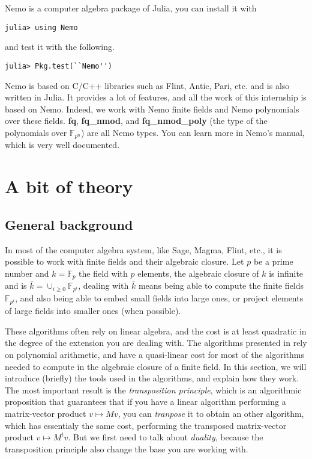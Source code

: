 \documentclass[a4paper,11pt]{article}
\theoremstyle{break}
\theoremstyle{definition}
\theoremstyle{remark}
\begin{document}
Nemo is a computer algebra package of Julia, you can install it with 
\begin{verbatim}
julia> using Nemo
\end{verbatim}
and test it with the following.
\begin{verbatim}
julia> Pkg.test(``Nemo'')
\end{verbatim}
Nemo is based on C/C++ libraries such as Flint, Antic, Pari, etc. and is also
written in Julia. It provides a lot of features, and all the work of this
internship is based on Nemo. Indeed, we work with Nemo finite fields and Nemo
polynomials over these fields. \textbf{fq}, \textbf{fq\_nmod}, and
\textbf{fq\_nmod\_poly} (the type of the polynomials over $\mathbb{F}_{p^n}$) 
are
all Nemo types. You can learn more in Nemo's manual, which is very well
documented.

\section{A bit of theory}
\subsection{General background}
In most of the computer algebra system, like Sage, Magma, Flint, etc., it is 
possible to work with finite
fields and their algebraic closure. Let $p$ be a prime number and
$k=\mathbb{F}_p$ the field with $p$ elements, the algebraic closure of $k$ is
infinite and is $\bar k = \cup_{i\geq 0} \mathbb{F}_{p^i}$, dealing with $\bar
k$ means being able to compute the finite fields $\mathbb{F}_{p^i}$, and also
being able to embed small fields into large ones, or project elements of large
fields into smaller ones (when possible).

These algorithms often rely on linear algebra, and the cost is at least 
quadratic in
the degree of the extension you are dealing with. The algorithms presented in
\cite{DeDoSc14} rely on polynomial arithmetic, and have a quasi-linear cost for 
most of the algorithms needed to
compute in the algebraic closure of a finite field. In this section, we will
introduce (briefly) the tools used in the algorithms, and explain how they work.
The most important result is the \emph{transposition principle}, which is an
algorithmic proposition that guarantees that if you have a linear algorithm
performing a matrix-vector product $v\mapsto Mv$, you can \emph{tranpose} it to
obtain an other algorithm, which has essentialy the same cost, performing the 
transposed matrix-vector product $v\mapsto
M^tv$. But we first need to talk about \emph{duality}, because the transposition
principle also change the base you are working with.
\end{document}
